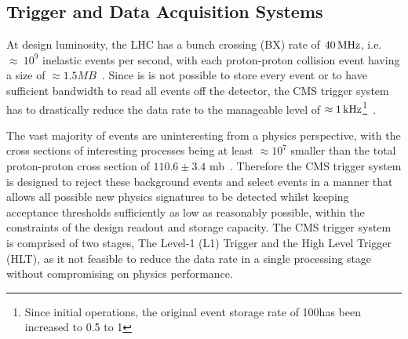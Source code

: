 \subsection{Trigger and Data Acquisition Systems}\label{subsec:trigger}
At design luminosity, the LHC has a bunch crossing (BX) rate of $40\text{\,MHz}$, i.e. $\approx~10^{9}$ inelastic events per second, with each proton-proton collision event having a size of $\approx 1.5MB$~\cite{Bayatian:2006nff}.
Since is is not possible to store every event or to have sufficient bandwidth to read all events off the detector, the CMS trigger system~\cite{Dasu:2000ge,Sphicas:2002gg} has to drastically reduce the data rate to the manageable level of $\approx 1\text{\,kHz}$\footnote{Since initial operations, the original event storage rate of 100\Hz has been increased to 0.5 to 1\kHz}~\cite{Dasu:2000ge,phase1L1TDR}.

The vast majority of events are uninteresting from a physics perspective, with the cross sections of interesting processes being at least $\approx 10^{7}$ smaller than the total proton-proton cross section of $110.6 \pm 3.4$ mb~\cite{Antchev:2017dia}.
Therefore the CMS trigger system is designed to reject these background events and select events in a manner that allows all possible new physics signatures to be detected whilst keeping acceptance thresholds sufficiently as low as reasonably possible, within the constraints of the design readout and storage capacity.
The CMS trigger system is comprised of two stages, The Level-1 (L1) Trigger and the High Level Trigger (HLT), as it not feasible to reduce the data rate in a single processing stage without compromising on physics performance.

